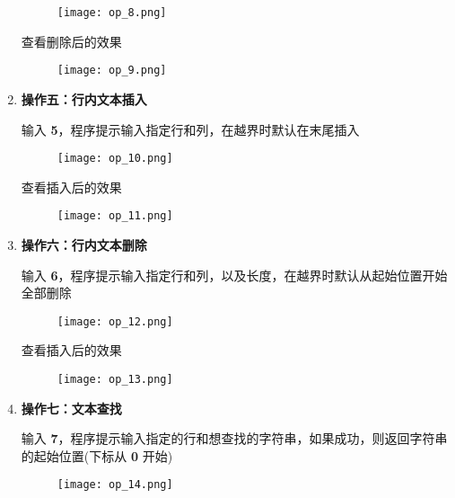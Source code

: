 \begin{enumerate}
                \begin{figure*}[htbp]
                    \centering
                    \texttt{[image: op\_8.png]}
                \end{figure*}
                \newpage
                \par 查看删除后的效果
                \begin{figure*}[htbp]
                    \centering
                    \texttt{[image: op\_9.png]}
                \end{figure*}
            \item \textbf{操作五：行内文本插入}
                \par 输入 \textbf{5}，程序提示输入指定行和列，在越界时默认在末尾插入
                \begin{figure*}[htbp]
                    \centering
                    \texttt{[image: op\_10.png]}
                \end{figure*}
                \par 查看插入后的效果
                \begin{figure*}[htbp]
                    \centering
                    \texttt{[image: op\_11.png]}
                \end{figure*}
            \newpage
            \item \textbf{操作六：行内文本删除}
                \par 输入 \textbf{6}，程序提示输入指定行和列，以及长度，在越界时默认从起始位置开始全部删除
                \begin{figure*}[htbp]
                    \centering
                    \texttt{[image: op\_12.png]}
                \end{figure*}
                \par 查看插入后的效果
                \begin{figure*}[htbp]
                    \centering
                    \texttt{[image: op\_13.png]}
                \end{figure*}
            \item \textbf{操作七：文本查找}
                \par 输入 \textbf{7}，程序提示输入指定的行和想查找的字符串，如果成功，则返回字符串的起始位置(下标从 \textbf{0} 开始)
                \begin{figure*}[htbp]
                    \centering
                    \texttt{[image: op\_14.png]}

\end{figure*}
\end{enumerate}

